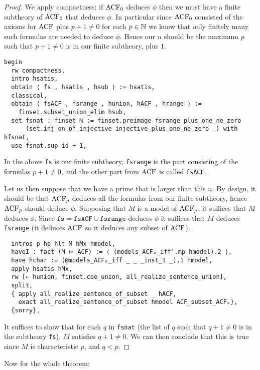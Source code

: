 \begin{proof}
We apply compactness:
if $\operatorname{ACF}_{0}$ deduces $\phi$ then we must have a finite subtheory of
$\operatorname{ACF}_{0}$ that deduces $\phi$.
In particular since $\operatorname{ACF}_{0}$ consisted of the axioms for $\operatorname{ACF}$ plus
$p + 1 \ne 0$ for each $p \in \mathbb{N}$ we know that only finitely many
such formulas are needed to deduce $\phi$.
Hence our $n$ should be the maximum $p$ such that $p + 1 \ne 0$
is in our finite subtheory, plus $1$.
\begin{lstlisting}
begin
  rw compactness,
  intro hsatis,
  obtain ⟨ fs , hsatis , hsub ⟩ := hsatis,
  classical,
  obtain ⟨ fsACF , fsrange , hunion, hACF , hrange ⟩ :=
    finset.subset_union_elim hsub,
  set fsnat : finset ℕ := finset.preimage fsrange plus_one_ne_zero
      (set.inj_on_of_injective injective_plus_one_ne_zero _) with hfsnat,
  use fsnat.sup id + 1, \end{lstlisting}

In the above \texttt{fs} is our finite subtheory,
\texttt{fsrange} is the part consisting of the formulas $p + 1 \ne 0$,
and the other part from $\operatorname{ACF}$ is called \texttt{fsACF}.

Let us then suppose that we have a prime that is larger than this $n$.
By design,
it should be that $\operatorname{ACF}_{p}$ deduces all the formulas from
our finite subtheory, hence $\operatorname{ACF}_{p}$ should deduce $\phi$.
Supposing that $M$ is a model of $\operatorname{ACF}_{p}$,
it suffices that $M$ deduces $\phi$.
Since $\texttt{fs} = \texttt{fsACF} \cup \texttt{fsrange}$
deduces $\phi$ it suffices that $M$ deduces \texttt{fsrange}
(it deduces $\operatorname{ACF}$ so it deduces any subset of $\operatorname{ACF}$).

\begin{lstlisting}
  intros p hp hlt M hMx hmodel,
  haveI : fact (M ⊨ ACF) := ⟨ (models_ACFₚ_iff'.mp hmodel).2 ⟩,
  have hchar := (@models_ACFₚ_iff _ _ _inst_1 _).1 hmodel,
  apply hsatis hMx,
  rw [← hunion, finset.coe_union, all_realize_sentence_union],
  split,
  { apply all_realize_sentence_of_subset _ hACF,
    exact all_realize_sentence_of_subset hmodel ACF_subset_ACFₚ},
  {sorry}, \end{lstlisting}

It suffices to show that for each $q$ in \texttt{fsnat}
(the list of $q$ such that $q + 1 \ne 0$ is in the subtheory \texttt{fs}),
$M$ satisfies $q + 1 \ne 0$.
We can then conclude that this is true since $M$ is characteristic $p$,
and $q < p$.
\end{proof}

Now for the whole theorem:

